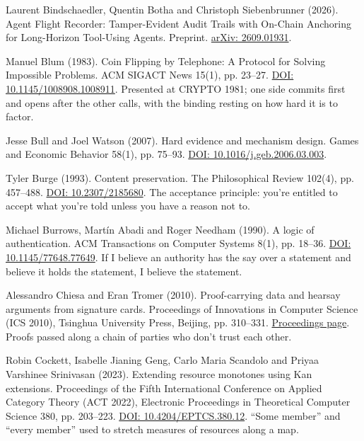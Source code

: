 \noindent Laurent Bindschaedler, Quentin Botha and Christoph Siebenbrunner (2026). Agent Flight Recorder: Tamper-Evident Audit Trails with On-Chain Anchoring for Long-Horizon Tool-Using Agents. Preprint. \href{https://arxiv.org/abs/2609.01931}{arXiv: 2609.01931}.
\par\medskip

\noindent Manuel Blum (1983). Coin Flipping by Telephone: A Protocol for Solving Impossible Problems. ACM SIGACT News 15(1), pp. 23--27. \href{https://doi.org/10.1145/1008908.1008911}{DOI: 10.1145/1008908.1008911}. Presented at CRYPTO 1981; one side commits first and opens after the other calls, with the binding resting on how hard it is to factor.
\par\medskip

\noindent Jesse Bull and Joel Watson (2007). Hard evidence and mechanism design. Games and Economic Behavior 58(1), pp. 75--93. \href{https://doi.org/10.1016/j.geb.2006.03.003}{DOI: 10.1016/j.geb.2006.03.003}.
\par\medskip

\noindent Tyler Burge (1993). Content preservation. The Philosophical Review 102(4), pp. 457--488. \href{https://doi.org/10.2307/2185680}{DOI: 10.2307/2185680}. The acceptance principle: you're entitled to accept what you're told unless you have a reason not to.
\par\medskip

\noindent Michael Burrows, Mart\'in Abadi and Roger Needham (1990). A logic of authentication. ACM Transactions on Computer Systems 8(1), pp. 18--36. \href{https://doi.org/10.1145/77648.77649}{DOI: 10.1145/77648.77649}. If I believe an authority has the say over a statement and believe it holds the statement, I believe the statement.
\par\medskip

\noindent Alessandro Chiesa and Eran Tromer (2010). Proof-carrying data and hearsay arguments from signature cards. Proceedings of Innovations in Computer Science (ICS 2010), Tsinghua University Press, Beijing, pp. 310--331. \href{https://conference.iiis.tsinghua.edu.cn/ICS2010/content/papers/25.html}{Proceedings page}. Proofs passed along a chain of parties who don't trust each other.
\par\medskip

\noindent Robin Cockett, Isabelle Jianing Geng, Carlo Maria Scandolo and Priyaa Varshinee Srinivasan (2023). Extending resource monotones using Kan extensions. Proceedings of the Fifth International Conference on Applied Category Theory (ACT 2022), Electronic Proceedings in Theoretical Computer Science 380, pp. 203--223. \href{https://doi.org/10.4204/EPTCS.380.12}{DOI: 10.4204/EPTCS.380.12}. ``Some member'' and ``every member'' used to stretch measures of resources along a map.
\par\medskip

